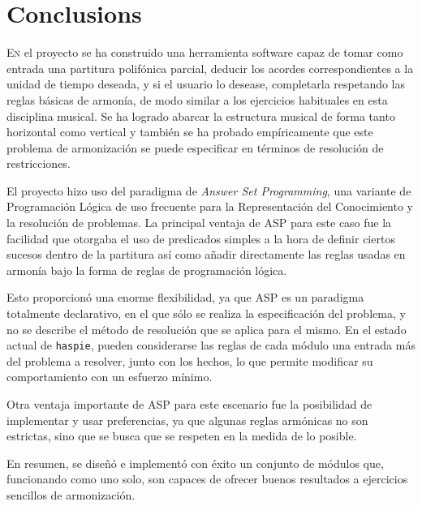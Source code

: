 \chapter{Conclusions}
\label{chap:conclusiones}
\vspace{0.5cm}

\lettrine{E}{n} el proyecto se ha construido una herramienta software capaz de tomar como entrada una partitura polifónica parcial, deducir los acordes correspondientes a la unidad de tiempo deseada, y si el usuario lo desease, completarla respetando las reglas básicas de armonía, de modo similar a los ejercicios habituales en esta disciplina musical. Se ha logrado abarcar la estructura musical de forma tanto horizontal como vertical y también se ha probado empíricamente que este problema de armonización se puede especificar en términos de resolución de restricciones.

El proyecto hizo uso del paradigma de \textit{Answer Set Programming}, una variante de Programación Lógica de uso frecuente para la Representación del Conocimiento y la resolución de problemas. La principal ventaja de ASP para este caso fue la facilidad que otorgaba el uso de predicados simples a la hora de definir ciertos sucesos dentro de la partitura así como añadir directamente las reglas usadas en armonía bajo la forma de reglas de programación lógica.

 Esto proporcionó una enorme flexibilidad, ya que ASP es un paradigma totalmente declarativo, en el que sólo se realiza la especificación del problema, y no se describe el método de resolución que se aplica para el mismo. En el estado actual de \texttt{haspie}, pueden considerarse las reglas de cada módulo una entrada más del problema a resolver, junto con los hechos, lo que permite modificar su comportamiento con un esfuerzo mínimo.
 
  Otra ventaja importante de ASP para este escenario fue la posibilidad de implementar y usar preferencias, ya que algunas reglas armónicas no son estrictas, sino que se busca que se respeten en la medida de lo posible. 
  
  En resumen, se diseñó e implementó con éxito un conjunto de módulos que, funcionando como uno solo, son capaces de ofrecer buenos resultados a ejercicios sencillos de armonización.

